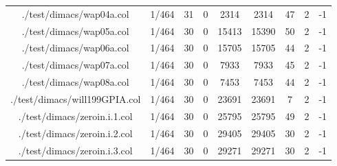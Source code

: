 \begin{table}[htb]
\begin{tabular}{@{}ccccccccc@{}}
        ./test/dimacs/wap04a.col & 1/464 & 31 & 0 & 2314 & 2314 & 47 & 2 & -1 \\
        ./test/dimacs/wap05a.col & 1/464 & 30 & 0 & 15413 & 15390 & 50 & 2 & -1 \\
        ./test/dimacs/wap06a.col & 1/464 & 30 & 0 & 15705 & 15705 & 44 & 2 & -1 \\
        ./test/dimacs/wap07a.col & 1/464 & 30 & 0 & 7933 & 7933 & 45 & 2 & -1 \\
        ./test/dimacs/wap08a.col & 1/464 & 30 & 0 & 7453 & 7453 & 44 & 2 & -1 \\
        ./test/dimacs/will199GPIA.col & 1/464 & 30 & 0 & 23691 & 23691 & 7 & 2 & -1 \\
        ./test/dimacs/zeroin.i.1.col & 1/464 & 30 & 0 & 25795 & 25795 & 49 & 2 & -1 \\
        ./test/dimacs/zeroin.i.2.col & 1/464 & 30 & 0 & 29405 & 29405 & 30 & 2 & -1 \\
        ./test/dimacs/zeroin.i.3.col & 1/464 & 30 & 0 & 29271 & 29271 & 30 & 2 & -1 \\
        \bottomrule
    \end{tabular}
\end{table}

